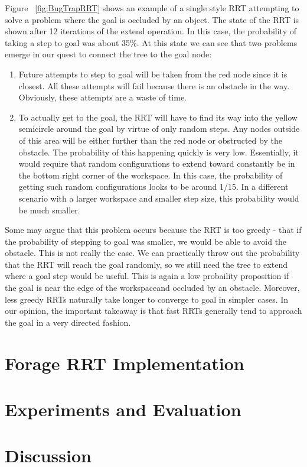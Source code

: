 \documentclass[conference]{IEEEtran}
\begin{document}
Figure ~\ref{fig:BugTrapRRT} shows an example of a single style RRT attempting to solve a problem where the goal is occluded by an object.
The state of the RRT is shown after 12 iterations of the extend operation. In this case, the probability of taking a step to goal was about
35\%. At this state we can see that two problems emerge in our quest to connect the tree to the goal node:
\begin{enumerate}
\item Future attempts to step to goal will be taken from the red node since it is closest. All these attempts will fail because there is an
obstacle in the way. Obviously, these attempts are a waste of time.
\item To actually get to the goal, the RRT will have to find its way into the yellow semicircle around the goal by virtue of only random
steps. Any nodes outside of this area will be either further than the red node or obstructed by the obstacle. The probability of this
happening quickly is very low. Essentially, it would require that random configurations to extend toward constantly be in the bottom right
corner of the workspace. In this case, the probability of getting such random configurations looks to be around 1/15. In a different
scenario with a larger workspace and smaller step size, this probability would be much smaller. 
\end{enumerate}

Some may argue that this problem occurs because the RRT is too greedy - that if the probability of stepping to goal was smaller, we would be
able to avoid the obstacle. This is not really the case. We can practically throw out the probability that the RRT will reach the goal
randomly, so we still need the tree to extend where a goal step would be useful. This is again a low probaility proposition if the goal is
near the edge of the workspaceand occluded by an obstacle. Moreover, less greedy RRTs naturally take longer to converge to goal in simpler
cases. In our opinion, the important takeaway is that fast RRTs generally tend to approach the goal in a very directed fashion.


\section{Forage RRT Implementation}

\section{Experiments and Evaluation}
\label{sec:evaluation}

\section{Discussion}



\end{document}
